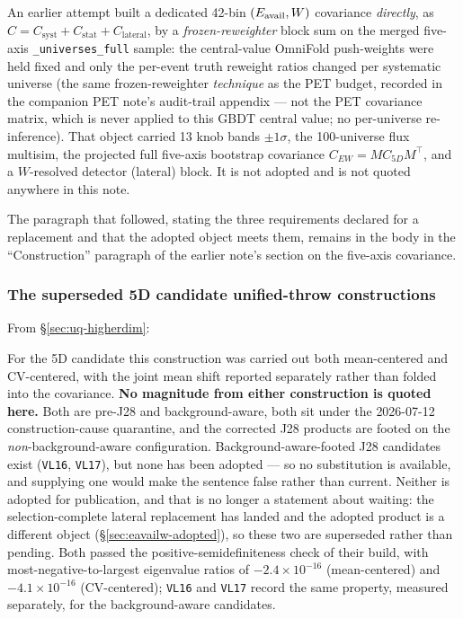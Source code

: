 An earlier attempt built a dedicated 42-bin $(E_{\mathrm{avail}},W)$ covariance \emph{directly}, as $C = C_{\mathrm{syst}}+C_{\mathrm{stat}}+C_{\mathrm{lateral}}$, by a \emph{frozen-reweighter} block sum on the merged five-axis \texttt{\_universes\_full} sample: the central-value OmniFold push-weights were held fixed and only the per-event truth reweight ratios changed per systematic universe (the same frozen-reweighter \emph{technique} as the PET budget, recorded in the companion PET note's audit-trail appendix --- not the PET covariance matrix, which is never applied to this GBDT central value; no per-universe re-inference). That object carried 13 knob bands $\pm1\sigma$, the 100-universe flux multisim, the projected full five-axis bootstrap covariance $C_{EW}=M C_{5D}M^{\top}$, and a $W$-resolved detector (lateral) block. It is not adopted and is not quoted anywhere in this note.

The paragraph that followed, stating the three requirements declared for a replacement and that the adopted object meets them, remains in the body in the ``Construction'' paragraph of the earlier note's section on the five-axis covariance.

\subsubsection{The superseded 5D candidate unified-throw constructions}
\label{app:history-5dcandidates}
From \S\ref{sec:uq-higherdim}:

For the 5D candidate this construction was carried out both mean-centered and CV-centered, with the joint mean shift reported separately rather than folded into the covariance. \textbf{No magnitude from either construction is quoted here.} Both are pre-J28 and background-aware, both sit under the 2026-07-12 construction-cause quarantine, and the corrected J28 products are footed on the \emph{non}-background-aware configuration. Background-aware-footed J28 candidates exist (\texttt{VL16}, \texttt{VL17}), but none has been adopted --- so no substitution is available, and supplying one would make the sentence false rather than current. Neither is adopted for publication, and that is no longer a statement about waiting: the selection-complete lateral replacement has landed and the adopted product is a different object (\S\ref{sec:eavailw-adopted}), so these two are superseded rather than pending. Both passed the positive-semidefiniteness check of their build, with most-negative-to-largest eigenvalue ratios of $-2.4\times10^{-16}$ (mean-centered) and $-4.1\times10^{-16}$ (CV-centered); \texttt{VL16} and \texttt{VL17} record the same property, measured separately, for the background-aware candidates.

